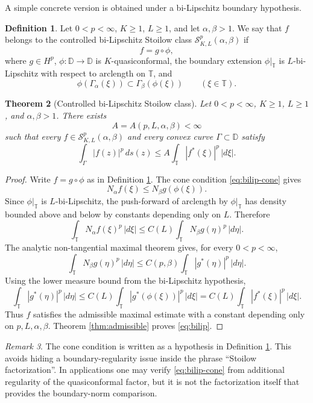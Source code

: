 \documentclass[11pt]{article}
\newtheorem{theorem}{Theorem}[section]
\theoremstyle{definition}
\newtheorem{definition}[theorem]{Definition}
\theoremstyle{remark}
\newtheorem{remark}[theorem]{Remark}
\newcommand{\D}{\mathbb D}
\newcommand{\T}{\mathbb T}
\newcommand{\ds}{\,ds}
\begin{document}
A simple concrete version is obtained under a bi-Lipschitz boundary hypothesis.

\begin{definition}\label{def:bilip}
Let $0<p<\infty$, $K\ge1$, $L\ge1$, and let $\alpha,\beta>1$. We say that $f$ belongs to the controlled bi-Lipschitz Stoilow class $\mathcal S^p_{K,L}(\alpha,\beta)$ if
\[
   f=g\circ\phi,
\]
where $g\in H^p$, $\phi:\D\to\D$ is $K$-quasiconformal, the boundary extension $\phi|_\T$ is $L$-bi-Lipschitz with respect to arclength on $\T$, and
\begin{equation}\label{eq:bilip-cone}
   \phi(\Gamma_\alpha(\xi))\subset \Gamma_\beta(\phi(\xi))
   \qquad (\xi\in\T).
\end{equation}
\end{definition}

\begin{theorem}[Controlled bi-Lipschitz Stoilow class]\label{thm:bilip}
Let $0<p<\infty$, $K\ge1$, $L\ge1$, and $\alpha,\beta>1$. There exists
\[
   A=A(p,L,\alpha,\beta)<\infty
\]
such that every $f\in\mathcal S^p_{K,L}(\alpha,\beta)$ and every convex curve $\Gamma\subset\D$ satisfy
\begin{equation}\label{eq:bilip}
   \int_\Gamma |f(z)|^p\ds(z)
   \le A\int_\T |f^*(\xi)|^p\,|d\xi|.
\end{equation}
\end{theorem}

\begin{proof}
Write $f=g\circ\phi$ as in Definition \ref{def:bilip}. The cone condition \eqref{eq:bilip-cone} gives
\[
   N_\alpha f(\xi)\le N_\beta g(\phi(\xi)).
\]
Since $\phi|_\T$ is $L$-bi-Lipschitz, the push-forward of arclength by $\phi|_\T$ has density bounded above and below by constants depending only on $L$. Therefore
\[
   \int_\T N_\alpha f(\xi)^p\,|d\xi|
   \le C(L)\int_\T N_\beta g(\eta)^p\,|d\eta|.
\]
The analytic non-tangential maximal theorem gives, for every $0<p<\infty$,
\[
   \int_\T N_\beta g(\eta)^p\,|d\eta|
   \le C(p,\beta)\int_\T |g^*(\eta)|^p\,|d\eta|.
\]
Using the lower measure bound from the bi-Lipschitz hypothesis,
\[
   \int_\T |g^*(\eta)|^p\,|d\eta|
   \le C(L)\int_\T |g^*(\phi(\xi))|^p\,|d\xi|
   =C(L)\int_\T |f^*(\xi)|^p\,|d\xi|.
\]
Thus $f$ satisfies the admissible maximal estimate with a constant depending only on $p,L,\alpha,\beta$. Theorem \ref{thm:admissible} proves \eqref{eq:bilip}.
\end{proof}

\begin{remark}
The cone condition is written as a hypothesis in Definition \ref{def:bilip}. This avoids hiding a boundary-regularity issue inside the phrase ``Stoilow factorization''. In applications one may verify \eqref{eq:bilip-cone} from additional regularity of the quasiconformal factor, but it is not the factorization itself that provides the boundary-norm comparison.
\end{remark}
\end{document}
